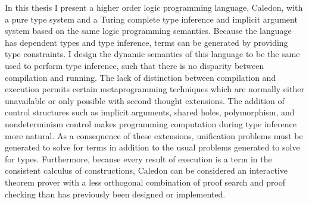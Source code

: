 In this thesis I present a higher order logic programming language, Caledon,
with a pure type system and a Turing complete type inference and implicit
argument system based on the same logic programming semantics. Because
the language has dependent types and type inference, terms can be
generated by providing type constraints. I design the dynamic semantics
of this language to be the same used to perform type inference,
such that there is no disparity between compilation and running. The lack
of distinction between compilation and execution permits certain metaprogramming
techniques which are normally either unavailable or only possible
with second thought extensions. The addition of control structures such
as implicit arguments, shared holes, polymorphism, and nondeterminism
control makes programming computation during type inference more natural.
As a consequence of these extensions, unification problems must be generated
to solve for terms in addition to the usual problems generated to solve
for types. Furthermore, because every result of execution is a term in the
consistent calculus of constructions, Caledon can be considered an interactive
theorem prover with a less orthogonal combination of proof search and
proof checking than has previously been designed or implemented.
